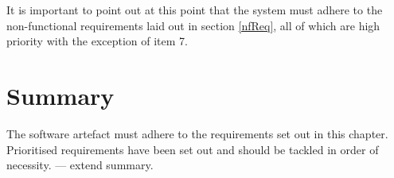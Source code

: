 It is important to point out at this point that the system must adhere to the non-functional requirements laid out in section \ref{nfReq}, all of which are high priority with the exception of item 7.

\section{Summary}
The software artefact must adhere to the requirements set out in this chapter.  Prioritised requirements have been set out and should be tackled in order of necessity. \revisit --- extend summary.